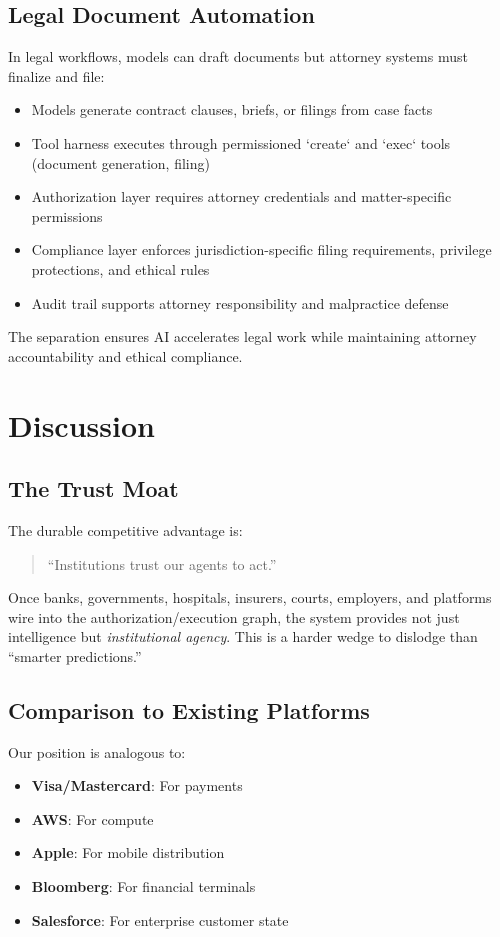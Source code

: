 \documentclass[11pt,a4paper]{article}
\begin{document}
\subsection{Legal Document Automation}

In legal workflows, models can draft documents but attorney systems must finalize and file:

\begin{itemize}
    \item Models generate contract clauses, briefs, or filings from case facts
    \item Tool harness executes through permissioned `create` and `exec` tools (document generation, filing)
    \item Authorization layer requires attorney credentials and matter-specific permissions
    \item Compliance layer enforces jurisdiction-specific filing requirements, privilege protections, and ethical rules
    \item Audit trail supports attorney responsibility and malpractice defense
\end{itemize}

The separation ensures AI accelerates legal work while maintaining attorney accountability and ethical compliance.

\section{Discussion}

\subsection{The Trust Moat}

The durable competitive advantage is:
\begin{quote}
``Institutions trust our agents to act.''
\end{quote}

Once banks, governments, hospitals, insurers, courts, employers, and platforms wire into the authorization/execution graph, the system provides not just intelligence but \textit{institutional agency}. This is a harder wedge to dislodge than ``smarter predictions.''

\subsection{Comparison to Existing Platforms}

Our position is analogous to:
\begin{itemize}
    \item \textbf{Visa/Mastercard}: For payments
    \item \textbf{AWS}: For compute
    \item \textbf{Apple}: For mobile distribution
    \item \textbf{Bloomberg}: For financial terminals
    \item \textbf{Salesforce}: For enterprise customer state
\end{itemize}
\end{document}
